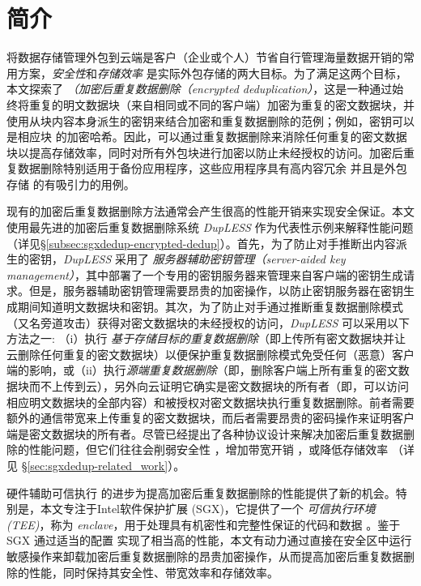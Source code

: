 \section{简介}
\label{sec:sgxdedup-introduction}

将数据存储管理外包到云端是客户（企业或个人）节省自行管理海量数据开销的常用方案，\textit{安全性}和\textit{存储效率} 是实际外包存储的两大目标。为了满足这两个目标，本文探索了 \textit{（加密后重复数据删除（encrypted deduplication）}，这是一种通过始终将重复的明文数据块（来自相同或不同的客户端）加密为重复的密文数据块，并使用从块内容本身派生的密钥来结合加密和重复数据删除的范例；例如，密钥可以是相应块 \cite{douceur2002reclaiming} 的加密哈希。因此，可以通过重复数据删除来消除任何重复的密文数据块以提高存储效率，同时对所有外包块进行加密以防止未经授权的访问。加密后重复数据删除特别适用于备份应用程序，这些应用程序具有高内容冗余 \cite{wallace12} 并且是外包存储 \cite{hasan2005outsourcing,kotla2007SafeStore,varble09} 的有吸引力的用例。
  
现有的加密后重复数据删除方法通常会产生很高的性能开销来实现安全保证。本文使用最先进的加密后重复数据删除系统 {\em DupLESS} \cite{bellare2013DupLESS} 作为代表性示例来解释性能问题（详见\S\ref{subsec:sgxdedup-encrypted-dedup}）。首先，为了防止对手推断出内容派生的密钥，{\em DupLESS} 采用了 \textit{服务器辅助密钥管理（server-aided key management）}，其中部署了一个专用的密钥服务器来管理来自客户端的密钥生成请求。但是，服务器辅助密钥管理需要昂贵的加密操作，以防止密钥服务器在密钥生成期间知道明文数据块和密钥。其次，为了防止对手通过推断重复数据删除模式（又名旁道攻击\cite{harnik2010side, halevi2011proofs}）获得对密文数据块的未经授权的访问，{\em DupLESS} 可以采用以下方法之一: （i）执行 \textit{基于存储目标的重复数据删除}（即上传所有密文数据块并让云删除任何重复的密文数据块）以便保护重复数据删除模式免受任何（恶意）客户端的影响，或（ii）执行\textit{源端重复数据删除}（即，删除客户端上所有重复的密文数据块而不上传到云），另外向云证明它确实是密文数据块的所有者（即，可以访问相应明文数据块的全部内容）和被授权对密文数据块执行重复数据删除。前者需要额外的通信带宽来上传重复的密文数据块，而后者需要昂贵的密码操作来证明客户端是密文数据块的所有者。尽管已经提出了各种协议设计来解决加密后重复数据删除的性能问题，但它们往往会削弱安全性 \cite{li2020TED,xu2013weak,pietro12}，增加带宽开销 \cite{harnik2010side,li15}，或降低存储效率 \cite{zhou2015secdep, qin17,li2020TED}（详见 \S\ref{sec:sgxdedup-related_work}）。
  
硬件辅助可信执行 \cite{trustzone,sgx,MK-TME,AMDSEV} 的进步为提高加密后重复数据删除的性能提供了新的机会。特别是，本文专注于Intel软件保护扩展 (SGX)，它提供了一个 \textit{ 可信执行环境 (TEE)}，称为 \textit{ enclave}，用于处理具有机密性和完整性保证的代码和数据 \cite{baumann2014Shielding }。鉴于 SGX 通过适当的配置 \cite{harnik18} 实现了相当高的性能，本文有动力通过直接在安全区中运行敏感操作来卸载加密后重复数据删除的昂贵加密操作，从而提高加密后重复数据删除的性能，同时保持其安全性、带宽效率和存储效率。

